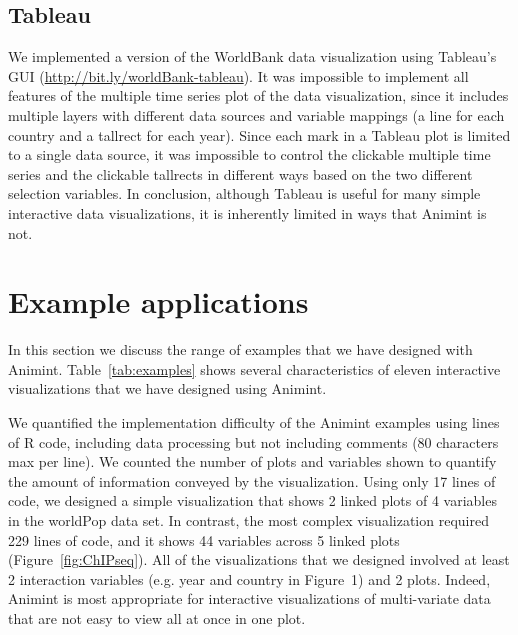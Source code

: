 \documentclass[10pt,journal,compsoc]{IEEEtran}\usepackage[]{graphicx}\usepackage[]{color}
\begin{document}
\subsection{Tableau}

We implemented a version of the WorldBank data visualization using
Tableau's GUI (\url{http://bit.ly/worldBank-tableau}).
It was impossible to implement all features of the multiple time
series plot of the data visualization, since it includes multiple
layers with different data sources and variable mappings (a line for
each country and a tallrect for each year). Since each mark in a
Tableau plot is limited to a single data source, it was impossible to
control the clickable multiple time series and the clickable tallrects
in different ways based on the two different selection variables. In
conclusion, although Tableau is useful for many simple interactive
data visualizations, it is inherently limited in ways that Animint is not.

\section{Example applications}

In this section we discuss the range of examples that we have designed
with Animint. Table~\ref{tab:examples} shows several characteristics
of eleven interactive visualizations that we have designed using
Animint.

We quantified the implementation difficulty of the Animint examples
using lines of R code, including data processing but not including
comments (80 characters max per line). We counted the number of plots
and variables shown to quantify the amount of information conveyed by
the visualization. Using only 17 lines of code, we designed a simple
visualization that shows 2 linked plots of 4 variables in the worldPop
data set. In contrast, the most complex visualization required 229
lines of code, and it shows 44 variables across 5 linked plots
(Figure~\ref{fig:ChIPseq}). All of the visualizations that we designed
involved at least 2 interaction variables (e.g. year and country in
Figure~1) and 2 plots. Indeed, Animint is most appropriate for
interactive visualizations of multi-variate data that are not easy to
view all at once in one plot.
\end{document}
